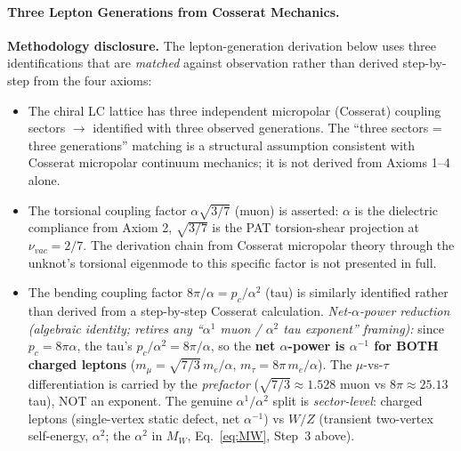 \paragraph{Three Lepton Generations from Cosserat Mechanics.}

\noindent\textbf{Methodology disclosure.} The lepton-generation derivation below uses three identifications that are \emph{matched} against observation rather than derived step-by-step from the four axioms:
\begin{itemize}
    \item The chiral LC lattice has three independent micropolar (Cosserat) coupling sectors $\to$ identified with three observed generations. The ``three sectors = three generations'' matching is a structural assumption consistent with Cosserat micropolar continuum mechanics; it is not derived from Axioms 1--4 alone.
    \item The torsional coupling factor $\alpha\sqrt{3/7}$ (muon) is asserted: $\alpha$ is the dielectric compliance from Axiom 2, $\sqrt{3/7}$ is the PAT torsion-shear projection at $\nu_{vac} = 2/7$. The derivation chain from Cosserat micropolar theory through the unknot's torsional eigenmode to this specific factor is not presented in full.
    \item The bending coupling factor $8\pi/\alpha = p_c/\alpha^2$ (tau) is similarly identified rather than derived from a step-by-step Cosserat calculation. \emph{Net-$\alpha$-power reduction (algebraic identity; retires any ``$\alpha^1$ muon / $\alpha^2$ tau exponent'' framing):} since $p_c = 8\pi\alpha$, the tau's $p_c/\alpha^2 = 8\pi/\alpha$, so the \textbf{net $\alpha$-power is $\alpha^{-1}$ for BOTH charged leptons} ($m_\mu = \sqrt{7/3}\,m_e/\alpha$, $m_\tau = 8\pi\,m_e/\alpha$). The $\mu$-vs-$\tau$ differentiation is carried by the \emph{prefactor} ($\sqrt{7/3} \approx 1.528$ muon vs $8\pi \approx 25.13$ tau), NOT an exponent. The genuine $\alpha^1/\alpha^2$ split is \emph{sector-level}: charged leptons (single-vertex static defect, net $\alpha^{-1}$) vs $W/Z$ (transient two-vertex self-energy, $\alpha^2$; the $\alpha^2$ in $M_W$, Eq.~\ref{eq:MW}, Step~3 above).
\end{itemize}
